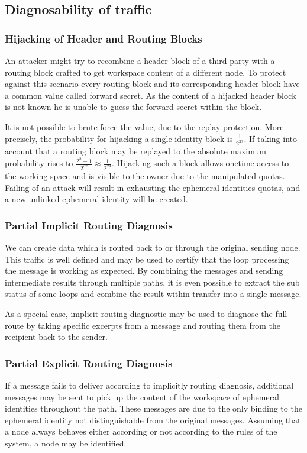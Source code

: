 \subsection{Diagnosability of traffic}

\subsubsection{Hijacking of Header and Routing Blocks}
An attacker might try to recombine a header block of a third party with a routing block crafted to get workspace content of a different node. To protect against this scenario every routing block and its corresponding header block have a common value called forward secret. As the content of a hijacked header block is not known he is unable to guess the forward secret within the block.

It is not possible to brute-force the value, due to the replay protection. More precisely, the probability for hijacking a single identity block is $\frac{1}{2^{32}}$. If taking into account that a routing block may be replayed to the absolute maximum probability rises to $\frac{2^8-1}{2^{32}}\approx\frac{1}{2^{24}}$. Hijacking such a block allows onetime access to the working space and is visible to the owner due to the manipulated quotas. Failing of an attack will result in exhausting the ephemeral identities quotas, and a new unlinked ephemeral identity will be created. 


\subsubsection{Partial Implicit Routing Diagnosis}
We can create data which is routed back to or through the original sending node. This traffic is well defined and may be used to certify that the loop processing the message is working as expected. By combining the messages and sending intermediate results through multiple paths, it is even possible to extract the sub status of some loops and combine the result within transfer into a single message.

As a special case, implicit routing diagnostic may be used to diagnose the full route by taking specific excerpts from a message and routing them from the recipient back to the sender. 

\subsubsection{Partial Explicit Routing Diagnosis}
If a message fails to deliver according to implicitly routing diagnosis, additional messages may be sent to pick up the content of the workspace of ephemeral identities throughout the path. These messages are due to the only binding to the ephemeral identity not distinguishable from the original messages. Assuming that a node always behaves either according or not according to the rules of the system, a node may be identified.

